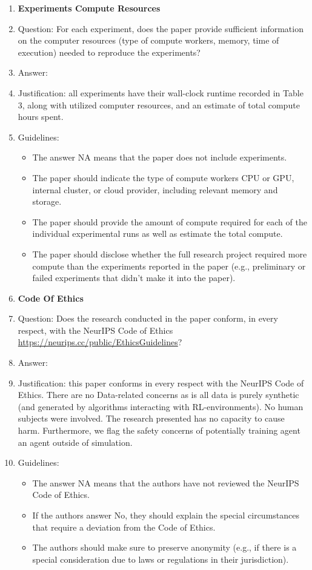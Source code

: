 \documentclass{article}
\begin{document}
\begin{enumerate}
\item {\bf Experiments Compute Resources}
    \item[] Question: For each experiment, does the paper provide sufficient information on the computer resources (type of compute workers, memory, time of execution) needed to reproduce the experiments?
    \item[] Answer: \answerYes{} %
    \item[] Justification: all experiments have their wall-clock runtime recorded in Table 3, along with utilized computer resources, and an estimate of total compute hours spent.
    \item[] Guidelines:
    \begin{itemize}
        \item The answer NA means that the paper does not include experiments.
        \item The paper should indicate the type of compute workers CPU or GPU, internal cluster, or cloud provider, including relevant memory and storage.
        \item The paper should provide the amount of compute required for each of the individual experimental runs as well as estimate the total compute. 
        \item The paper should disclose whether the full research project required more compute than the experiments reported in the paper (e.g., preliminary or failed experiments that didn't make it into the paper). 
    \end{itemize}
    
\item {\bf Code Of Ethics}
    \item[] Question: Does the research conducted in the paper conform, in every respect, with the NeurIPS Code of Ethics \url{https://neurips.cc/public/EthicsGuidelines}?
    \item[] Answer: \answerYes{} %
    \item[] Justification: this paper conforms in every respect with the NeurIPS Code of Ethics. There are no Data-related concerns as is all data is purely synthetic (and generated by algorithms interacting with RL-environments). No human subjects were involved. The research presented has no capacity to cause harm. Furthermore, we flag the safety concerns of potentially training agent an agent outside of simulation.
    \item[] Guidelines:
    \begin{itemize}
        \item The answer NA means that the authors have not reviewed the NeurIPS Code of Ethics.
        \item If the authors answer No, they should explain the special circumstances that require a deviation from the Code of Ethics.
        \item The authors should make sure to preserve anonymity (e.g., if there is a special consideration due to laws or regulations in their jurisdiction).
    \end{itemize}



\end{enumerate}
\end{document}

